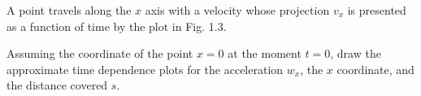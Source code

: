 
\item A point travels along the \( x \) axis with a velocity whose projection \( v_x \) is presented as a function of time by the plot in Fig. 1.3.
    \begin{center}
    \end{center}
    Assuming the coordinate of the point \( x = 0 \) at the moment \( t = 0 \), draw the approximate time dependence plots for the acceleration \( w_x \), the \( x \) coordinate, and the distance covered \( s \).

